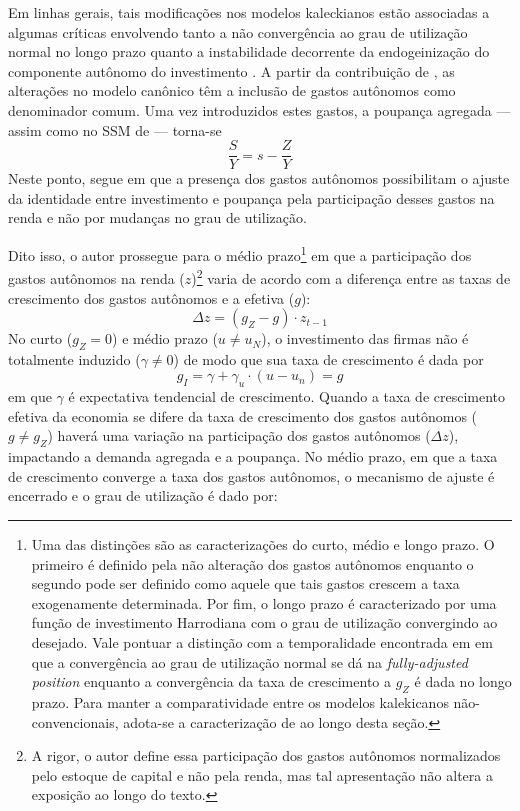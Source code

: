 Em linhas gerais, tais modificações nos modelos kaleckianos estão associadas a algumas críticas envolvendo tanto a não convergência ao grau de utilização normal no longo prazo quanto a instabilidade decorrente da endogeinização do componente autônomo do investimento \cites{dallery_kaleckian_2007}{skott_theoretical_2012}{hein_harrodian_2012}.
A partir da contribuição de \textcite{allain_tackling_2015}, as alterações no modelo canônico têm a inclusão de gastos autônomos como denominador comum.
Uma vez introduzidos estes gastos, a poupança agregada --- assim como no SSM de \textcite{serrano_sraffian_1995} --- torna-se
$$
\frac{S}{Y} = s - \frac{Z}{Y}
$$
Neste ponto, \textcite[p.~10]{allain_tackling_2015} segue \textcite{serrano_sraffian_1995} em que a presença dos gastos autônomos possibilitam o ajuste da identidade entre investimento e poupança pela participação desses gastos na renda e não por mudanças no grau de utilização. 

Dito isso, o autor prossegue para o médio prazo\footnote{
	Uma das distinções \textcite{allain_tackling_2015} são as caracterizações do curto, médio e longo prazo. O primeiro é definido pela não alteração dos gastos autônomos enquanto o segundo pode ser definido como aquele que tais gastos crescem a taxa exogenamente determinada. Por fim, o longo prazo é caracterizado por uma função de investimento Harrodiana com o grau de utilização convergindo ao desejado. Vale pontuar a distinção com a temporalidade encontrada em \textcite{freitas_growth_2015} em que a convergência ao grau de utilização normal se dá na \textit{fully-adjusted position} enquanto a convergência da taxa de crescimento a $g_Z$ é dada no longo prazo. Para manter a comparatividade entre os modelos kalekicanos não-convencionais, adota-se a caracterização de \textcite{allain_tackling_2015} ao longo desta seção.
} em que a participação dos gastos autônomos na renda ($z$)\footnote{A rigor, o autor define essa participação dos gastos autônomos normalizados pelo estoque de capital e não pela renda, mas tal apresentação não altera a exposição ao longo do texto.} varia de acordo com a diferença entre as taxas de crescimento dos gastos autônomos e a efetiva ($g$):
\begin{equation}
\Delta z = (g_Z - g)\cdot z_{t-1}
\end{equation}
No curto ($g_Z = 0$) e médio prazo ($u \neq u_N$), o investimento das firmas não é totalmente induzido ($\gamma \neq 0$) de modo que sua taxa de crescimento é dada por
$$
g_I = \gamma + \gamma_u\cdot (u - u_n) = g
$$
em que $\gamma$ é expectativa tendencial de crescimento.
Quando a taxa de crescimento efetiva da economia se difere da taxa de crescimento dos gastos autônomos ($g\neq g_Z$)  haverá uma variação na participação dos gastos autônomos ($\Delta z$), impactando a demanda agregada e a poupança. No médio prazo, em que a taxa de crescimento converge a taxa dos gastos autônomos, o mecanismo de ajuste é encerrado e o grau de utilização é dado por:

